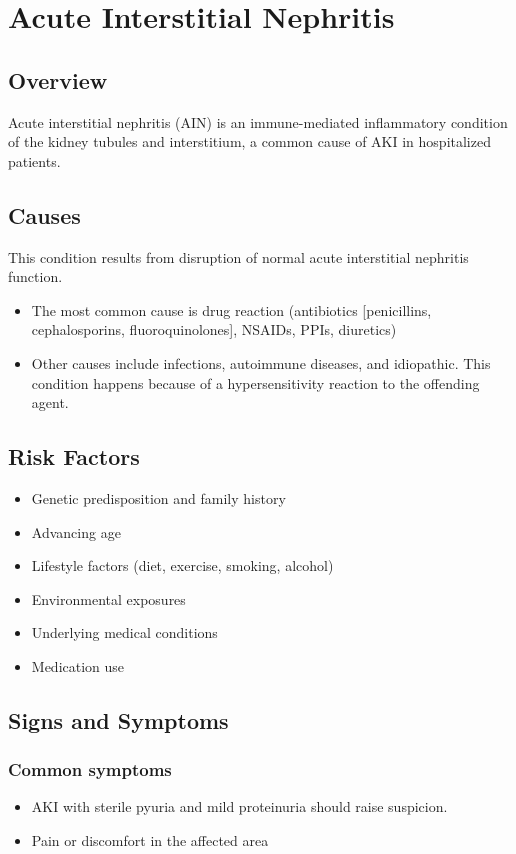 \chapter{Acute Interstitial Nephritis}
\label{sec:Acute Interstitial Nephritis}

\section{Overview}
Acute interstitial nephritis (AIN) is an immune-mediated inflammatory condition of the kidney tubules and interstitium, a common cause of AKI in hospitalized patients.
\section{Causes}
This condition results from disruption of normal acute interstitial nephritis function.

\begin{itemize}[noitemsep]
  \item The most common cause is drug reaction (antibiotics [penicillins, cephalosporins, fluoroquinolones], NSAIDs, PPIs, diuretics)
  \item Other causes include infections, autoimmune diseases, and idiopathic. This condition happens because of a hypersensitivity reaction to the offending agent.
\end{itemize}
\section{Risk Factors}


\begin{itemize}[noitemsep]
  \item Genetic predisposition and family history
  \item Advancing age
  \item Lifestyle factors (diet, exercise, smoking, alcohol)
  \item Environmental exposures
  \item Underlying medical conditions
  \item Medication use
\end{itemize}
\section{Signs and Symptoms}

\subsection{Common symptoms}
\begin{itemize}[noitemsep]
  \item AKI with sterile pyuria and mild proteinuria should raise suspicion.

  \item Pain or discomfort in the affected area
  \end{itemize}

